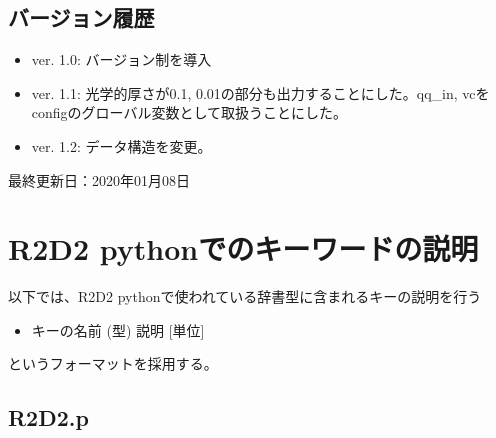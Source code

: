 \documentclass[letterpaper,10pt,dvipdfmx,report]{sphinxmanual}
\begin{document}
\section{バージョン履歴}
\label{\detokenize{io:id6}}\begin{itemize}
\item {} 
ver. 1.0: バージョン制を導入

\item {} 
ver. 1.1: 光学的厚さが0.1, 0.01の部分も出力することにした。qq\_in, vcをconfigのグローバル変数として取扱うことにした。

\item {} 
ver. 1.2: データ構造を変更。

\end{itemize}

最終更新日：2020年01月08日


\chapter{R2D2 pythonでのキーワードの説明}
\label{\detokenize{notation:r2d2-python}}\label{\detokenize{notation::doc}}
以下では、R2D2 pythonで使われている辞書型に含まれるキーの説明を行う
\begin{itemize}
\item {} 
キーの名前 (型) \sphinxhyphen{}\sphinxhyphen{} 説明 {[}単位{]}

\end{itemize}

というフォーマットを採用する。


\section{R2D2.p}
\label{\detokenize{notation:r2d2-p}}
\end{document}
